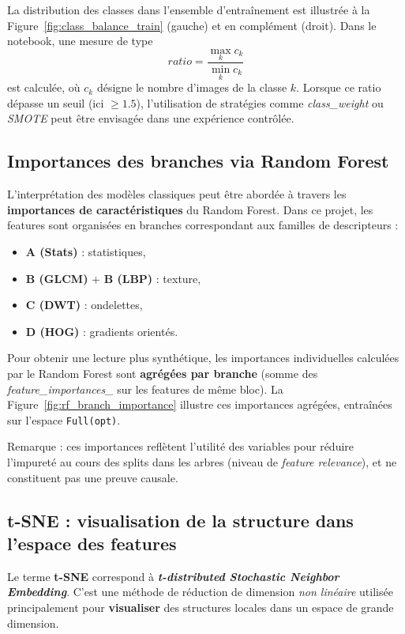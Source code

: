 \documentclass[12pt,a4paper]{article}
\begin{document}
    La distribution des classes dans l’ensemble d’entraînement est illustrée à la Figure~\ref{fig:class_balance_train} (gauche) et en complément (droit).
    Dans le notebook, une mesure de type
    \[
    \textit{ratio}=\frac{\max_k c_k}{\min_k c_k}
    \]
    est calculée, où \(c_k\) désigne le nombre d’images de la classe \(k\).
    Lorsque ce ratio dépasse un seuil (ici \(\geq 1.5\)), l’utilisation de stratégies comme \textit{class\_weight} ou \textit{SMOTE} peut être envisagée dans une expérience contrôlée.

    \subsection{Importances des branches via Random Forest}
    L’interprétation des modèles classiques peut être abordée à travers les \textbf{importances de caractéristiques} du Random Forest.
    Dans ce projet, les features sont organisées en branches correspondant aux familles de descripteurs :
    \begin{itemize}
        \item \textbf{A (Stats)} : statistiques,
        \item \textbf{B (GLCM)} + \textbf{B (LBP)} : texture,
        \item \textbf{C (DWT)} : ondelettes,
        \item \textbf{D (HOG)} : gradients orientés.
    \end{itemize}

    Pour obtenir une lecture plus synthétique, les importances individuelles calculées par le Random Forest sont \textbf{agrégées par branche} (somme des \textit{feature\_importances\_} sur les features de même bloc).
    La Figure~\ref{fig:rf_branch_importance} illustre ces importances agrégées, entraînées sur l’espace \texttt{Full(opt)}.

    \noindent Remarque : ces importances reflètent l’utilité des variables pour réduire l’impureté au cours des splits dans les arbres (niveau de \textit{feature relevance}), et ne constituent pas une preuve causale.

    \subsection{t-SNE : visualisation de la structure dans l’espace des features}
    Le terme \textbf{t-SNE} correspond à \textbf{\textit{t-distributed Stochastic Neighbor Embedding}}.
    C’est une méthode de réduction de dimension \textit{non linéaire} utilisée principalement pour \textbf{visualiser} des structures locales dans un espace de grande dimension.
\end{document}
